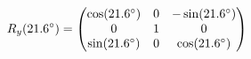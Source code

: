 \documentclass[preview]{standalone}
\begin{document}
\begin{align*}
\special{dvisvgm:raw <g id='unique000'>}R_y(21.6^\circ) = \begin{pmatrix} \cos(21.6^\circ) & 0 & -\sin(21.6^\circ) \\ 0 & 1 & 0 \\ \sin(21.6^\circ) & 0 & \cos(21.6^\circ) \end{pmatrix}\special{dvisvgm:raw </g>}
\end{align*}
\end{document}
